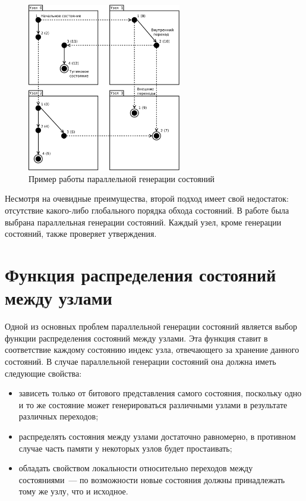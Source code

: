 \documentclass[12pt,a4paper,fleqn]{article}
\begin{document}
\begin{figure}[ht]
  \centering
  \includegraphics[width=0.6\textwidth]{graphics/distr-generation-2.pdf}
  \caption{Пример работы параллельной генерации состояний}
  \label{fig:distr-generation}
\end{figure}

Несмотря на очевидные преимущества, второй подход имеет свой недостаток: отсутствие какого-либо глобального порядка обхода состояний. В работе была выбрана параллельная генерации состояний. Каждый узел, кроме генерации состояний, также проверяет утверждения.


\section{Функция распределения состояний между узлами}
\label{sec:state-partition}

Одной из основных проблем параллельной генерации состояний является выбор функции распределения состояний между
узлами.
Эта функция ставит в соответствие каждому состоянию индекс узла, отвечающего за хранение данного
состояний.
В случае параллельной генерации состояний она должна иметь следующие свойства:

\begin{itemize}
\item зависеть только от битового представления самого состояния, поскольку одно и то же состояние
  может генерироваться различными узлами в результате различных переходов;

\item распределять состояния между узлами достаточно равномерно, в противном случае часть памяти у некоторых
  узлов будет простаивать;

\item обладать свойством локальности относительно переходов между состояниями~--- по возможности новые
  состояния должны принадлежать тому же узлу, что и исходное.
\end{itemize}
\end{document}
